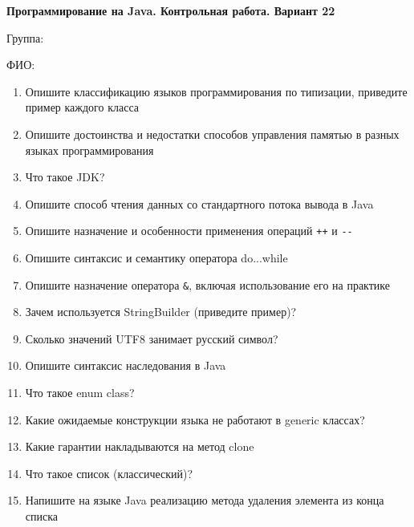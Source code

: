 \documentclass[12pt]{article}
\begin{document}
\newpage\begin{minipage}{\textwidth}
\textbf{Программирование на Java. Контрольная работа. Вариант 22}

Группа: \underline{\hspace{3cm}}

ФИО: \underline{\hspace{10cm}}

\begin{enumerate}
\item Опишите классификацию языков программирования по типизации, приведите пример каждого класса
\item Опишите достоинства и недостатки способов управления памятью в разных языках программирования
\item Что такое JDK?
\item Опишите способ чтения данных со стандартного потока вывода в Java
\item Опишите назначение и особенности применения операций \verb|++| и \verb|--|
\item Опишите синтаксис и семантику оператора do...while
\item Опишите назначение оператора \verb|&|, включая использование его на практике
\item Зачем используется StringBuilder (приведите пример)?
\item Сколько значений UTF8 занимает русский символ?
\item Опишите синтаксис наследования в Java
\item Что такое enum class?
\item Какие ожидаемые конструкции языка не работают в generic классах?
\item Какие гарантии накладываются на метод clone
\item Что такое список (классический)?
\item Напишите на языке Java реализацию метода удаления элемента из конца списка

\end{enumerate}
\end{minipage}
\end{document}
